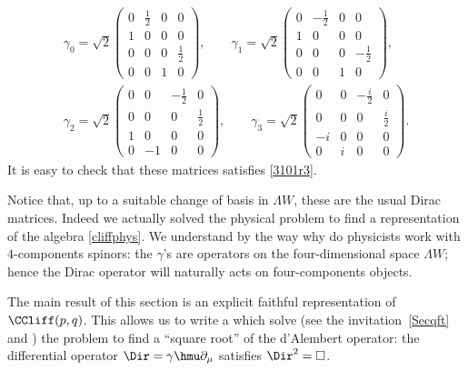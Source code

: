 \begin{equation}
\begin{split}
\gamma_0=\sqrt{2}\begin{pmatrix}
0 & \frac{1}{2} & 0 & 0 \\
1 & 0 & 0 & 0 \\
0 & 0 & 0 & \frac{1}{2} \\
0 & 0 & 1 & 0
\end{pmatrix}, \qquad
\gamma_1=\sqrt{2}\left(\begin{matrix}
0 & -\frac{1}{2} & 0 & 0 \\
1 & 0 & 0 & 0 \\
0 & 0 & 0 & -\frac{1}{2} \\
0 & 0 & 1 & 0
\end{matrix}\right),\\
\gamma_2=\sqrt{2}\begin{pmatrix}
0 & 0 & -\frac{1}{2} & 0 \\
0 & 0 & 0 & \frac{1}{2} \\
1 & 0 & 0 & 0 \\
0 & -1 & 0 & 0
\end{pmatrix},\qquad
\gamma_3=\sqrt{2}\begin{pmatrix}
0 & 0 & -\frac{i}{2} & 0 \\
0 & 0 & 0 & \frac{i}{2} \\
-i & 0 & 0 & 0 \\
0 & i & 0 & 0
\end{pmatrix}.
\end{split}
\end{equation}
It is easy to check that these matrices satisfies \eqref{3101r3}.

Notice that, up to a suitable change of basis in $\Lambda W $, these are the usual Dirac matrices. Indeed we actually solved the physical problem to find a representation of the algebra \eqref{cliffphys}.  We understand by the way why do physicists work with $4$-components spinors: the $\gamma$'s are operators on the four-dimensional space $\Lambda W$; hence the Dirac operator will naturally acts on four-components objects.

The main result of this section is an explicit faithful representation of $\CCliff(p,q)$. This allows us to write a  which solve (see the invitation~\ref{Secqft} and \cite{Bronn}) the problem  to find a ``square root'' of the d'Alembert operator: the differential operator $\Dir=\gamma\hmu\partial_{\mu}$ satisfies $\Dir^2=\Box$.

